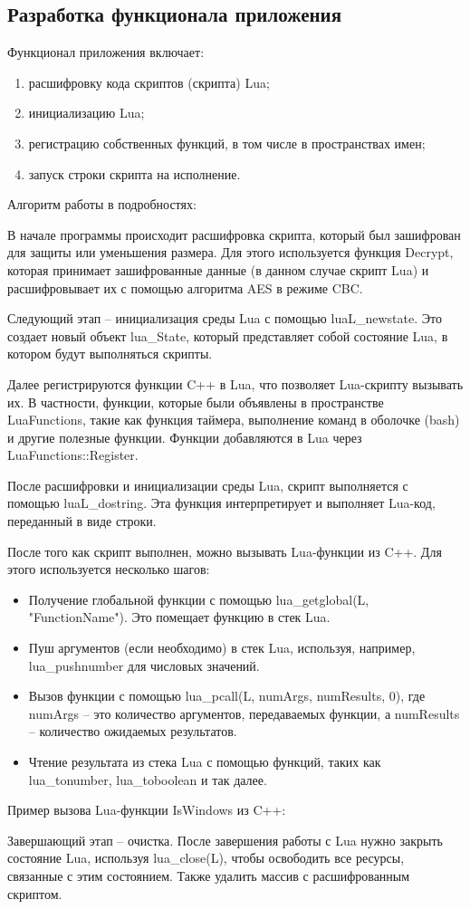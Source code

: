 \subsection{Разработка функционала приложения}

Функционал приложения включает:
\begin{enumerate}
	\item расшифровку кода скриптов (скрипта) Lua;
	\item инициализацию Lua;
	\item регистрацию собственных функций, в том числе в пространствах имен;
	\item запуск строки скрипта на исполнение.
\end{enumerate}

Алгоритм работы в подробностях:

В начале программы происходит расшифровка скрипта, который был зашифрован для защиты или уменьшения размера. Для этого используется функция Decrypt, которая принимает зашифрованные данные (в данном случае скрипт Lua) и расшифровывает их с помощью алгоритма AES в режиме CBC.

Следующий этап -- инициализация среды Lua с помощью luaL\_newstate. Это создает новый объект lua\_State, который представляет собой состояние Lua, в котором будут выполняться скрипты.

Далее регистрируются функции C++ в Lua, что позволяет Lua-скрипту вызывать их. В частности, функции, которые были объявлены в пространстве LuaFunctions, такие как функция таймера, выполнение команд в оболочке (bash) и другие полезные функции. Функции добавляются в Lua через LuaFunctions::Register.

После расшифровки и инициализации среды Lua, скрипт выполняется с помощью luaL\_dostring. Эта функция интерпретирует и выполняет Lua-код, переданный в виде строки.

После того как скрипт выполнен, можно вызывать Lua-функции из C++. Для этого используется несколько шагов:
\begin{itemize}
	\item Получение глобальной функции с помощью lua\_getglobal(L, "FunctionName"). Это помещает функцию в стек Lua.
	\item Пуш аргументов (если необходимо) в стек Lua, используя, например, lua\_pushnumber для числовых значений.
	\item Вызов функции с помощью lua\_pcall(L, numArgs, numResults, 0), где numArgs -- это количество аргументов, передаваемых функции, а numResults -- количество ожидаемых результатов.
	\item Чтение результата из стека Lua с помощью функций, таких как lua\_tonumber, lua\_toboolean и так далее.
\end{itemize}

Пример вызова Lua-функции IsWindows из C++:

Завершающий этап -- очистка. После завершения работы с Lua нужно закрыть состояние Lua, используя lua\_close(L), чтобы освободить все ресурсы, связанные с этим состоянием. Также удалить массив с расшифрованным скриптом.

\clearpage